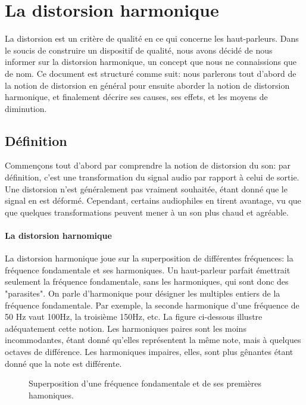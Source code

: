 

\section{La distorsion harmonique}

La distorsion est un critère de qualité en ce qui concerne les haut-parleurs.
Dans le soucis de construire un dispositif de qualité, nous avons décidé de 
nous informer sur la distorsion harmonique, un concept que nous ne connaissions
que de nom.
Ce document est structuré comme suit: nous parlerons tout d'abord de la notion  de distorsion 
en général pour ensuite aborder la notion  de distorsion 
harmonique, et finalement décrire ses causes, ses effets,
et les moyens de diminution.

\subsection{Définition}
Commençons tout d'abord par comprendre la notion de distorsion du son: par définition, c'est
une transformation du signal audio par rapport à celui de sortie. Une distorsion n'est généralement pas vraiment souhaitée, étant donné
que le signal en est déformé. Cependant, certains audiophiles en tirent avantage, vu que que quelques
transformations peuvent mener à un son plus chaud et agréable.

\paragraph{La distorsion harnomique}
La distorsion harmonique joue sur la superposition de différentes fréquences:
la fréquence fondamentale et ses harmoniques. Un haut-parleur parfait émettrait seulement la fréquence fondamentale, sans les harmoniques, qui sont donc des "parasites".
On parle d'harmonique pour désigner les multiples entiers de la fréquence fondamentale.
Par exemple, la seconde harmonique d'une fréquence de 50 Hz vaut 100Hz, la troisième 150Hz, etc. La figure 
ci-dessous illustre adéquatement cette notion.
Les harmoniques paires sont les moins incommodantes, étant donné qu'elles représentent la même note, mais à quelques octaves de différence.
Les harmoniques impaires, elles, sont plus gênantes étant donné que la note est différente.

\begin{figure}[ht!]
\centering
{}
\caption{Superposition d'une fréquence fondamentale et de ses premières hamoniques.}
\label{Superposition d'une fréquence fondamentale et de ses premières hamoniques.}
\end{figure}


